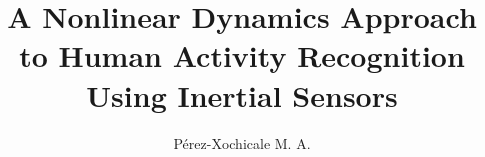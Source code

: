 \documentclass{sigchi}
\begin{document}
\title{A Nonlinear Dynamics Approach to Human Activity Recognition Using
Inertial Sensors}

\author{
  \alignauthor P\'erez-Xochicale M. A.\\
    \\
     \\
}

\maketitle
\end{document}
